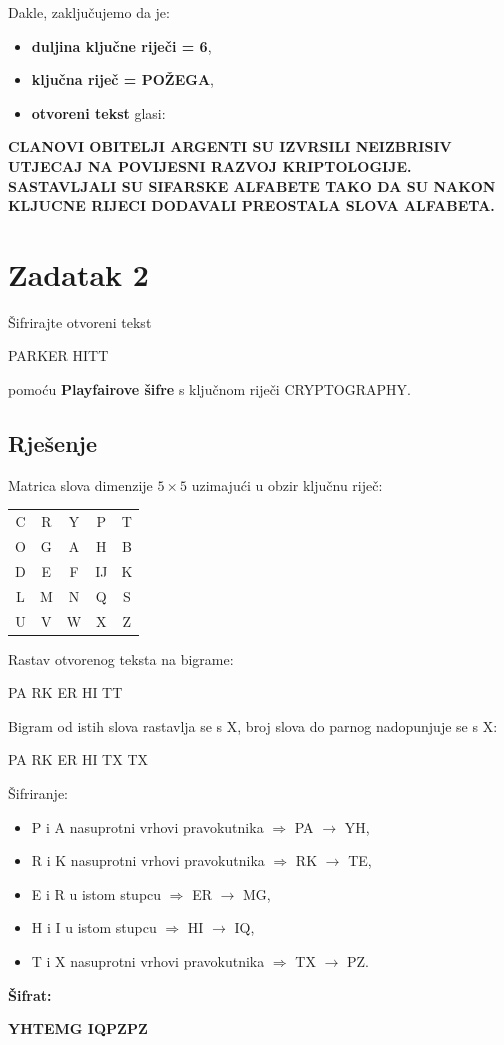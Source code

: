 \documentclass[a4paper,12pt,oneside]{article}
\begin{document}
Dakle, zaključujemo da je:
\begin{itemize}
\item \textbf{duljina ključne riječi = 6},
 
\item\textbf{ključna riječ = POŽEGA},
  
\item \textbf{otvoreni tekst} glasi:
\end{itemize}
\textbf{CLANOVI OBITELJI ARGENTI SU IZVRSILI NEIZBRISIV UTJECAJ NA POVIJESNI RAZVOJ KRIPTOLOGIJE. SASTAVLJALI SU SIFARSKE ALFABETE TAKO DA SU NAKON KLJUCNE RIJECI DODAVALI PREOSTALA SLOVA ALFABETA.}

\newpage
\section*{Zadatak 2}
Šifrirajte otvoreni tekst 
\begin{center}
PARKER HITT
\end{center}
\noindent pomoću \textbf{Playfairove šifre} s ključnom riječi CRYPTOGRAPHY.
\subsection*{Rješenje}
\noindent Matrica slova dimenzije $5 \times 5$ uzimajući u obzir ključnu riječ:
\begin{table}[h!]
	\centering
	\begin{tabular}{ccccc}
		C & R & Y & P & T \\
		O & G & A & H & B \\
		D & E & F & IJ & K \\
		L & M & N & Q & S \\
		U & V & W & X & Z \\
	\end{tabular}
\end{table}

\noindent Rastav otvorenog teksta na bigrame:
\begin{center}
	 PA  RK  ER  HI  TT
\end{center}
Bigram od istih slova rastavlja se s X, broj slova do parnog nadopunjuje se s X:
\begin{center}
	PA  RK  ER  HI  TX  TX
\end{center}
Šifriranje:
\begin{itemize}
	\item P i A nasuprotni vrhovi pravokutnika $\Rightarrow$ PA $\rightarrow$ YH,
	\item R i K nasuprotni vrhovi pravokutnika $\Rightarrow$ RK $\rightarrow$ TE,
	\item E i R u istom stupcu $\Rightarrow$ ER $\rightarrow$ MG,
	\item H i I u istom stupcu $\Rightarrow$ HI $\rightarrow$ IQ,
	\item T i X nasuprotni vrhovi pravokutnika $\Rightarrow$ TX $\rightarrow$ PZ.
\end{itemize}
\textbf{Šifrat:}
\begin{center}
		\textbf{YHTEMG  IQPZPZ}
\end{center}
\end{document}
